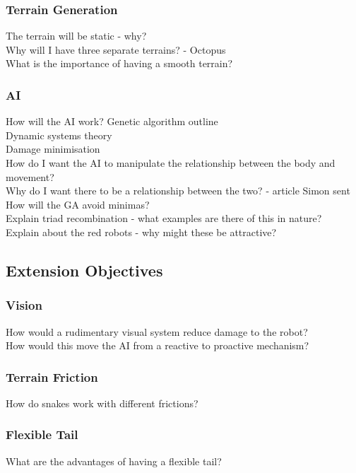 \documentclass{article}
\begin{document}
\subsubsection{Terrain Generation}
The terrain will be static - why?\\
Why will I have three separate terrains? - Octopus\\
What is the importance of having a smooth terrain?\\
\subsubsection{AI}
How will the AI work? Genetic algorithm outline\\
Dynamic systems theory\\
Damage minimisation\\
How do I want the AI to manipulate the relationship between the body and movement?\\
Why do I want there to be a relationship between the two? - article Simon sent\\
How will the GA avoid minimas?\\
Explain triad recombination - what examples are there of this in nature?\\
Explain about the red robots - why might these be attractive?\\


\subsection{Extension Objectives}
\subsubsection{Vision}
How would a rudimentary visual system reduce damage to the robot?\\
How would this move the AI from a reactive to proactive mechanism?\\
\subsubsection{Terrain Friction}
How do snakes work with different frictions?\\
\subsubsection{Flexible Tail}
What are the advantages of having a flexible tail?\\
\end{document}
